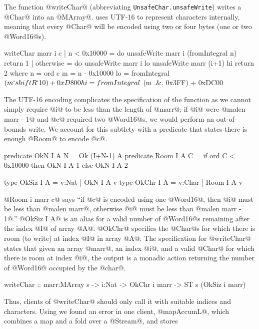 The function @writeChar@ (abbreviating \texttt{UnsafeChar.unsafeWrite})
writes a @Char@ into an @MArray@.
\libtext uses UTF-16 to represent characters internally,
meaning that every @Char@ will be encoded using two or 
four bytes (one or two @Word16@s).
%
\begin{code}
  writeChar marr i c
      | n < 0x10000 = do
          unsafeWrite marr i (fromIntegral n)
          return 1
      | otherwise = do
          unsafeWrite marr i lo
          unsafeWrite marr (i+1) hi
          return 2
      where n = ord c
            m = n - 0x10000
            lo = fromIntegral
               $ (m `shiftR` 10) + 0xD800
            hi = fromIntegral
               $ (m .&. 0x3FF) + 0xDC00
\end{code}
%
The UTF-16 encoding complicates the specification of the function
as we cannot simply require @i@ to be less than the length of 
@marr@; if @i@ were @malen marr - 1@ and @c@ required two 
@Word16@s, we would perform an out-of-bounds write. 
%
We account for this subtlety with a predicate that states 
there is enough @Room@ to encode @c@.
%
\begin{code}
  predicate OkN I A N  = Ok (I+N-1) A
  predicate Room I A C = if ord C < 0x10000
                         then OkN I A 1
                         else OkN I A 2
  
  type OkSiz I A = {v:Nat  | OkN  I A v}
  type OkChr I A = {v:Char | Room I A v}
\end{code}
%
@Room i marr c@ says 
``if @c@ is encoded using one @Word16@, 
  then @i@ must be less than @malen marr@,
  otherwise @i@ must be less than @malen marr - 1@.''
%
@OkSiz I A@ is an alias for a valid number of @Word16@s 
remaining after the index @I@ of array @A@. 
@OkChr@ specifies the @Char@s for which there is room (to write)
at index @I@ in array @A@.
%
The specification for @writeChar@ states that given an array \hbox{@marr@,}
an index @i@, and a valid @Char@ for which there is room at index \hbox{@i@,}
the output is a monadic action returning the number of @Word16@ occupied
by the @char@.
%
\begin{code}
  writeChar :: marr:MArray s
            -> i:Nat
            -> OkChr i marr
            -> ST s (OkSiz i marr)
\end{code}
%
Thus, clients of @writeChar@ should only call it with suitable indices
and characters.
%
Using \toolname we found an error in one client, @mapAccumL@, 
which combines a map and a fold over a @Stream@, and stores 
